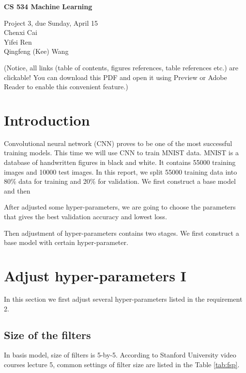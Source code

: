 \documentclass[11pt]{article}
\begin{document}
\begin{center}
  {\bf
  CS 534 Machine Learning  }

\vspace{12pt}

  Project 3, due Sunday, April 15
  \\
  Chenxi Cai \\
  Yifei Ren \\
  Qingfeng (Kee) Wang
 
\end{center}

\vspace{12pt}




\clearpage
(Notice, all links (table of contents, figures references, table references etc.) are clickable! You can download this PDF and open it using Preview or Adobe Reader to enable this convenient feature.)
 
\tableofcontents{}

\clearpage


\section{Introduction}
Convolutional neural network (CNN) proves to be one of the most successful training models. This time we will use CNN to train MNIST data. MNIST is a database of handwritten figures in black and white. It contains 55000 training images and 10000 test images. In this report, we split 55000 training data into 80\% data for training and 20\% for validation. We first construct a base model and then 

After adjusted some hyper-parameters, we are going to choose the parameters that gives the best validation accuracy and lowest loss. 

Then adjustment of hyper-parameters contains two stages. We first construct a base model with certain hyper-parameter.



\section{Adjust hyper-parameters I}
In this section we first adjust several hyper-parameters listed in the requirement 2.


\subsection{Size of the filters}
In basis model, size of filters is 5-by-5. According to Stanford University video courses lecture 5, common settings of filter size are listed in the Table \ref{tab:fsp}.
\end{document}
